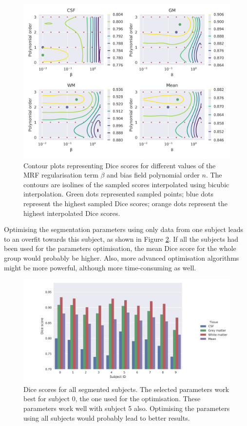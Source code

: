\begin{figure}
  \centering
  \includegraphics[width=\textwidth]{figures/parameters_dices}
  \caption{Contour plots representing Dice scores for different values of the MRF regularisation term $\beta$ and bias field polynomial order $n$. The contours are isolines of the sampled scores interpolated using bicubic interpolation. Green dots represented sampled points; blue dots represent the highest sampled Dice scores; orange dots represent the highest interpolated Dice scores.}
  \label{fig:params-optimisation}
\end{figure}



Optimising the segmentation parameters using only data from one subject leads to an overfit towards this subject, as shown in Figure \ref{fig:dices-bars}. If all the subjects had been used for the parameters optimisation, the mean Dice score for the whole group would probably be higher. Also, more advanced optimisation algorithms might be more powerful, although more time-consuming as well.

\begin{figure}
  \centering
  \includegraphics[width=\textwidth]{figures/dices_bars}
  \caption{Dice scores for all segmented subjects. The selected parameters work best for subject 0, the one used for the optimisation. These parameters work well with subject 5 also. Optimising the parameters using all subjects would probably lead to better results.}
  \label{fig:dices-bars}
\end{figure}
